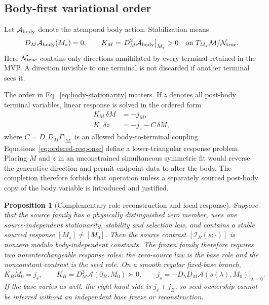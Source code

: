 \documentclass[11pt]{article}
\newtheorem{proposition}{Proposition}
\begin{document}
\subsection{Body-first variational order}

Let \(\mathcal A_{\rm body}\) denote the atemporal body action.  Stabilization
means
\begin{equation}
  D_M\mathcal A_{\rm body}(M_*)=0,
  \qquad
  K_M=\left.D_M^2\mathcal A_{\rm body}\right|_{M_*}>0
  \quad\text{on }T_{M_*}\mathcal M/\mathcal N_{\rm true}.
  \label{eq:body-stationarity}
\end{equation}
Here \(\mathcal N_{\rm true}\) contains only directions annihilated by every
terminal retained in the MVP.  A direction invisible to one terminal is not
discarded if another terminal sees it.

The order in Eq.~\eqref{eq:body-stationarity} matters.  If \(z\) denotes all
post-body terminal variables, linear response is solved in the ordered form
\begin{align}
  K_M\,\delta M &=-j_M,\\
  K_z\,\delta z &=-j_z-C\,\delta M,
  \label{eq:ordered-response}
\end{align}
where \(C=D_zD_M\Gamma|_{M_*}\) is an allowed body-to-terminal coupling.
Equations~\eqref{eq:ordered-response} define a lower-triangular response
problem.  Placing \(M\) and \(z\) in an unconstrained simultaneous symmetric
fit would reverse the generative direction and permit endpoint data to alter
the body.  The completion therefore forbids that operation unless a separately
sourced post-body copy of the body variable is introduced and justified.

\begin{proposition}[Complementary role reconstruction and local response]
\label{prop:seed-base-role-reconstruction-active}
Suppose that the source family has a physically distinguished zero member,
uses one source-independent stationarity, stability and selection law, and
contains a stable sourced response $[M_s]\ne[M_0]$.  Then the source contrast
$[\mathcal I_B(s;\cdot)]$ is nonzero modulo body-independent constants.  The
frozen family therefore requires two noninterchangeable response roles: the
zero-source law is the base role and the nonconstant contrast is the seed
role.  On a smooth regular fixed-base branch,
\begin{equation}
 K_B\dot M_0=j_s,
 \qquad
 K_B=D_M^2\mathcal A(0_B,M_0)\succ0,
 \qquad
 j_s=-\left.D_\lambda D_M\mathcal A(s(\lambda),M_0)\right|_{\lambda=0}.
 \label{eq:seed-base-local-response-active}
\end{equation}
If the base varies as well, the right-hand side is $j_s+j_B$, so seed
ownership cannot be inferred without an independent base freeze or
reconstruction.
\end{proposition}
\end{document}
